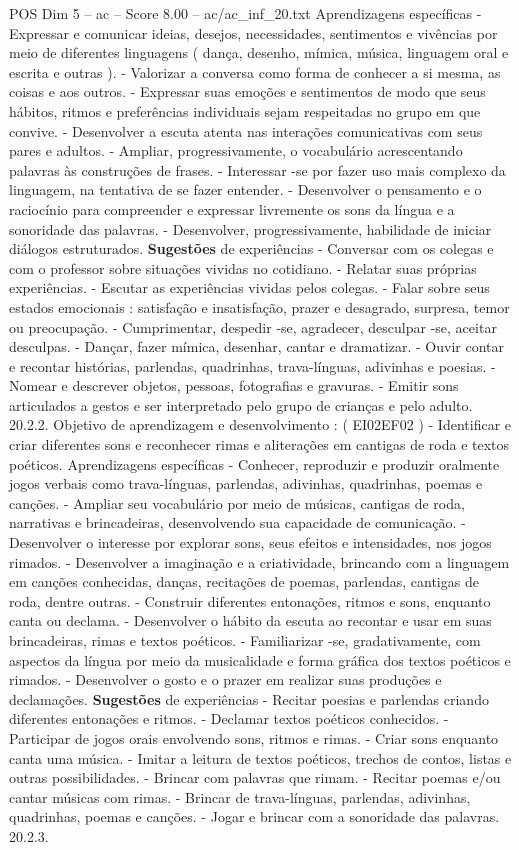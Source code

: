 \begin{textsample}{POS Dim 5 – ac – Score 8.00 – ac/ac\_inf\_20.txt}
Aprendizagens específicas - Expressar e comunicar ideias, desejos, necessidades, sentimentos e vivências por meio de diferentes linguagens ( dança, desenho, mímica, música, linguagem oral e escrita e outras ). - Valorizar a conversa como forma de conhecer a si mesma, as coisas e aos outros. - Expressar suas emoções e sentimentos de modo que seus hábitos, ritmos e preferências individuais sejam respeitadas no grupo em que convive. - Desenvolver a escuta atenta nas interações comunicativas com seus pares e adultos. - Ampliar, progressivamente, o vocabulário acrescentando palavras às construções de frases. - Interessar -se por fazer uso mais complexo da linguagem, na tentativa de se fazer entender. - Desenvolver o pensamento e o raciocínio para compreender e expressar livremente os sons da língua e a sonoridade das palavras. - Desenvolver, progressivamente, habilidade de iniciar diálogos estruturados. \textbf{Sugestões} de experiências - Conversar com os colegas e com o professor sobre situações vividas no cotidiano. - Relatar suas próprias experiências. - Escutar as experiências vividas pelos colegas. - Falar sobre seus estados emocionais : satisfação e insatisfação, prazer e desagrado, surpresa, temor ou preocupação. - Cumprimentar, despedir -se, agradecer, desculpar -se, aceitar desculpas. - Dançar, fazer mímica, desenhar, cantar e dramatizar. - Ouvir contar e recontar histórias, parlendas, quadrinhas, trava-línguas, adivinhas e poesias. - Nomear e descrever objetos, pessoas, fotografias e gravuras. - Emitir sons articulados a gestos e ser interpretado pelo grupo de crianças e pelo adulto. 20.2.2.
Objetivo de aprendizagem e desenvolvimento : ( EI02EF02 ) - Identificar e criar diferentes sons e reconhecer rimas e aliterações em cantigas de roda e textos poéticos.
Aprendizagens específicas - Conhecer, reproduzir e produzir oralmente jogos verbais como trava-línguas, parlendas, adivinhas, quadrinhas, poemas e canções. - Ampliar seu vocabulário por meio de músicas, cantigas de roda, narrativas e brincadeiras, desenvolvendo sua capacidade de comunicação. - Desenvolver o interesse por explorar sons, seus efeitos e intensidades, nos jogos rimados. - Desenvolver a imaginação e a criatividade, brincando com a linguagem em canções conhecidas, danças, recitações de poemas, parlendas, cantigas de roda, dentre outras. - Construir diferentes entonações, ritmos e sons, enquanto canta ou declama. - Desenvolver o hábito da escuta ao recontar e usar em suas brincadeiras, rimas e textos poéticos. - Familiarizar -se, gradativamente, com aspectos da língua por meio da musicalidade e forma gráfica dos textos poéticos e rimados. - Desenvolver o gosto e o prazer em realizar suas produções e declamações. \textbf{Sugestões} de experiências - Recitar poesias e parlendas criando diferentes entonações e ritmos. - Declamar textos poéticos conhecidos. - Participar de jogos orais envolvendo sons, ritmos e rimas. - Criar sons enquanto canta uma música. - Imitar a leitura de textos poéticos, trechos de contos, listas e outras possibilidades. - Brincar com palavras que rimam. - Recitar poemas e/ou cantar músicas com rimas. - Brincar de trava-línguas, parlendas, adivinhas, quadrinhas, poemas e canções. - Jogar e brincar com a sonoridade das palavras. 20.2.3.

\end{textsample}
